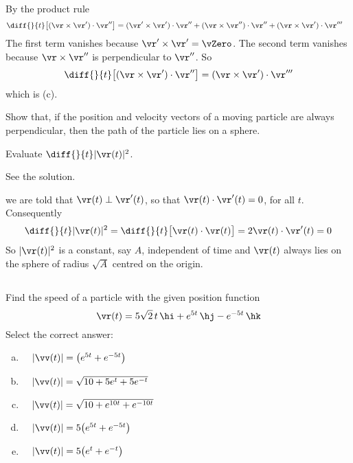 \begin{solution}
By the product rule
\begin{align*}
\diff{\hfill}{t}\big[ (\vr \times \vr')\cdot\vr'' \big]
&= (\vr' \times \vr')\cdot\vr''
  +(\vr \times \vr'')\cdot\vr''
  +(\vr \times \vr')\cdot\vr'''
\end{align*}
The first term vanishes because $\vr'\times\vr'=\vZero$.
The second term vanishes because $\vr \times \vr''$ is perpendicular to
$\vr''$. So
\begin{equation*}
\diff{\hfill}{t}\big[ (\vr \times \vr')\cdot\vr'' \big]
= (\vr \times \vr')\cdot\vr'''
\end{equation*}
which is (c).
\end{solution}

\begin{question}
Show that, if the position and velocity vectors of a moving 
particle are always perpendicular, then the path of the particle lies on
a sphere.
\end{question}

\begin{hint} 
Evaluate $\diff{}{t} |\vr(t)|^2$.
\end{hint}

\begin{answer}
See the solution.
\end{answer}

\begin{solution}
we are told that $\vr(t)\perp\vr'(t)$, so that $\vr(t)\cdot\vr'(t)=0$, 
for all $t$. Consequently
$$
\diff{}{t}|\vr(t)|^2
=\diff{}{t}\big[\vr(t)\cdot\vr(t)\big]
=2\vr(t)\cdot\vr'(t)=0
$$
So $|\vr(t)|^2$ is a constant, say $A$, independent of time and $\vr(t)$
always lies on the sphere of radius $\sqrt{A}$ centred on the origin.
\end{solution}

\subsection*{\Procedural}

\begin{question}[M317 2005D] %
Find the speed of a particle with the given position function
\begin{equation*}
\vr(t) = 5 \sqrt{2}\,t\,\hi + e^{5t}\,\hj - e^{-5t}\,\hk
\end{equation*}
Select the correct answer:
\begin{enumerate}[(a)]
\item\ \ 
$|\vv(t)| = \big(e^{5t} + e^{-5t}\big)$
\item\ \ 
$|\vv(t)| = \sqrt{10 + 5e^{t} + 5e^{-t}}$
\item\ \ 
$|\vv(t)| = \sqrt{10 + e^{10t} + e^{-10t}}$
\item\ \ 
$|\vv(t)| = 5\big(e^{5t} + e^{-5t}\big)$
\item\ \ 
$|\vv(t)| = 5\big(e^t + e^{-t}\big)$
\end{enumerate}
\end{question}

